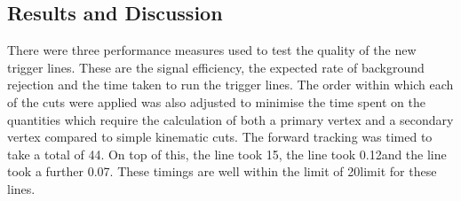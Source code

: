 \subsection{Results and Discussion}
\label{sec:trigdev:results}

There were three performance measures used to test the quality of the new trigger lines.
These are the signal efficiency, the expected rate of background rejection 
and the time taken to run the trigger lines.
The order within which each of the cuts were applied was also adjusted to minimise the time spent on the 
quantities which require the calculation of both a primary 
vertex and a secondary vertex compared to simple kinematic cuts.
The \hlttwo forward tracking was timed to take a total of 44\ms. On top of this, the \muonetrack line took 15\ms, the \mutwotrack line took 0.12\ms and the \muthreetrack line took a further 0.07\ms.
These timings are well within the limit of 20\ms limit for these lines.

